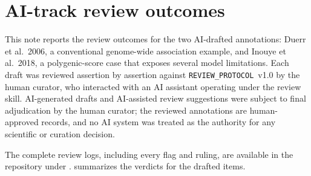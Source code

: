 

\section{AI-track review outcomes}
\label{sec:supp-ai-review}

This note reports the review outcomes for the two AI-drafted annotations:
Duerr et al.\ 2006, a conventional genome-wide association example, and
Inouye et al.\ 2018, a polygenic-score case that exposes several model
limitations.
Each draft was reviewed assertion by assertion against
\texttt{REVIEW\_PROTOCOL}~v1.0 by the human curator, who interacted with
an AI assistant operating under the review skill.
AI-generated drafts and
AI-assisted review suggestions were subject to final adjudication by the
human curator; the reviewed annotations are human-approved records, and no
AI system was treated as the authority for any scientific or curation
decision.

The complete review logs, including every flag and ruling, are available in
the repository under .
 summarizes the verdicts for the drafted items.

